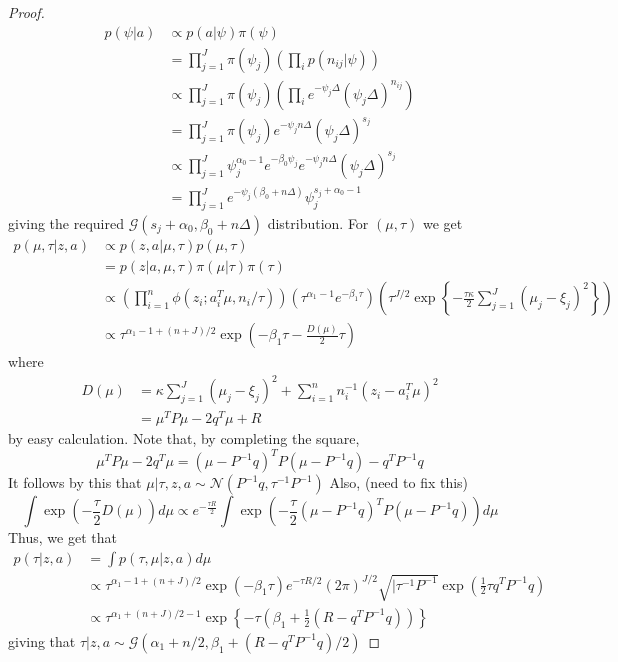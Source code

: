 \documentclass[a4paper,11pt]{article}
\theoremstyle{theorem}
\theoremstyle{definition}
\theoremstyle{remark}
\begin{document}
\begin{proof}
\begin{align*}
p(\psi | a) &\propto p(a | \psi)\pi(\psi) \\
&= \prod_{j=1}^{J}{\pi(\psi_j)\left(\prod_{i}{p(n_{ij} | \psi)}\right)} \\
&\propto \prod_{j=1}^{J}{\pi(\psi_j)\left(\prod_{i}{e^{-\psi_j\Delta}(\psi_j\Delta)^{n_{ij}}}\right)} \\
&= \prod_{j=1}^{J}{\pi(\psi_j)e^{-\psi_j n\Delta}(\psi_j\Delta)^{s_{j}}} \\
&\propto \prod_{j=1}^{J}{\psi_{j}^{\alpha_{0} - 1}e^{-\beta_0 \psi_j}e^{-\psi_j n\Delta}(\psi_j\Delta)^{s_{j}}} \\
&= \prod_{j=1}^{J}{e^{-\psi_j(\beta_0 + n\Delta)}\psi_{j}^{s_j + \alpha_0 - 1}}
\end{align*}
giving the required $\mathcal{G}(s_j + \alpha_0, \beta_0 + n \Delta)$ distribution.
For $(\mu, \tau)$ we get
\begin{align*}
p(\mu, \tau | z, a) &\propto p(z, a | \mu, \tau)p(\mu, \tau) \\
&= p(z | a, \mu, \tau)\pi(\mu | \tau)\pi(\tau) \\
&\propto \left(\prod_{i=1}^{n}{\phi(z_i; a_{i}^{T} \mu, n_i/\tau)}\right)\left(\tau^{\alpha_1 - 1}e^{-\beta_1 \tau}\right) \left(\tau^{J/2} \exp{\left\lbrace -\frac{\tau\kappa}{2} \sum_{j=1}^{J}{(\mu_j - \xi_j)^2}\right\rbrace}\right) \\
&\propto \tau^{\alpha_1 - 1 + (n + J)/2}\exp{\left(-\beta_1\tau - \frac{D(\mu)}{2}\tau\right)}
\end{align*}
where
\begin{align*}
D(\mu) &= \kappa\sum_{j=1}^{J}{(\mu_j - \xi_j)^2} + \sum_{i=1}^{n}{n_{i}^{-1}(z_i - a_{i}^{T} \mu)^2} \\
&= \mu^{T} P \mu - 2 q^T \mu + R
\end{align*}
by easy calculation. Note that, by completing the square,
\[
\mu^{T} P \mu - 2 q^T \mu = (\mu - P^{-1} q)^{T} P (\mu - P^{-1}q) - q^{T} P^{-1} q
\]
It follows by this that $\mu | \tau, z, a \sim  \mathcal{N}(P^{-1} q, \tau^{-1} P^{-1}) $ Also, (need to fix this)
\begin{equation}
\int{\exp(-\frac{\tau}{2}D(\mu))d\mu} \propto e^{-\frac{\tau R}{2}}\int{\exp\left(-\frac{\tau}{2}(\mu - P^{-1} q)^{T} P (\mu - P^{-1}q)\right)d\mu}
\end{equation}
Thus, we get that
\begin{align*}
p(\tau | z, a) &= \int{p(\tau, \mu | z, a)d\mu} \\
&\propto \tau^{ \alpha_1 - 1 + (n + J)/2}\exp(-\beta_1 \tau)e^{-\tau R/2}(2\pi)^{J/2}\sqrt{|\tau^{-1}P^{-1}}\exp\left(\frac{1}{2}\tau q^T P^{-1} q \right)  \\
&\propto \tau^{\alpha_1 + (n+J)/2 - 1}\exp{\left\lbrace -\tau\left(\beta_1 + \frac{1}{2}(R - q^T P^{-1} q)\right) \right\rbrace} 
\end{align*}
giving that $\tau | z, a  \sim  \mathcal{G}(\alpha_1 + n/2, \beta_1 + (R - q^T P^{-1} q)/2)$
\end{proof}


\end{document}
